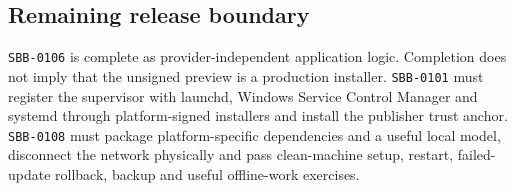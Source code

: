 \subsection{Remaining release boundary}

\texttt{SBB-0106} is complete as provider-independent application logic. Completion does not imply
that the unsigned preview is a production installer. \texttt{SBB-0101} must register the supervisor
with launchd, Windows Service Control Manager and systemd through platform-signed installers and
install the publisher trust anchor. \texttt{SBB-0108} must package platform-specific dependencies and
a useful local model, disconnect the network physically and pass clean-machine setup, restart,
failed-update rollback, backup and useful offline-work exercises.
